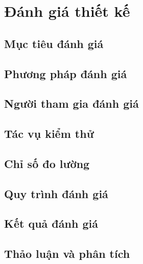 \section{Đánh giá thiết kế}

\subsection{Mục tiêu đánh giá}

\subsection{Phương pháp đánh giá}

\subsection{Người tham gia đánh giá}

\subsection{Tác vụ kiểm thử}

\subsection{Chỉ số đo lường}

\subsection{Quy trình đánh giá}

\subsection{Kết quả đánh giá}

\subsection{Thảo luận và phân tích}

